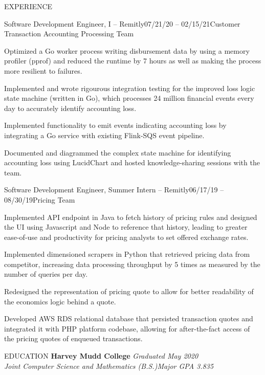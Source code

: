 \documentclass{resume} %
\begin{document}
\begin{rSection}{EXPERIENCE}
    \begin{rSubsection}{Software Development Engineer, I -- Remitly}{07/21/20 -- 02/15/21}{Customer Transaction Accounting Processing Team}{}
        \item Optimized a Go worker process writing disbursement data by using a memory profiler (pprof) and reduced the runtime by 7 hours as well as making the process more resilient to failures.
        \item Implemented and wrote rigourous integration testing for the improved loss logic state machine (written in Go), which processes 24 million financial events every day to accurately identify accounting loss.
        \item Implemented functionality to emit events indicating accounting loss by integrating a Go service with existing Flink-SQS event pipeline.
        \item Documented and diagrammed the complex state machine for identifying accounting loss using LucidChart and hosted knowledge-sharing sessions with the team.
    \end{rSubsection}
    
    \begin{rSubsection}{Software Development Engineer, Summer Intern -- Remitly}{06/17/19 -- 08/30/19}{Pricing Team}{}
        \item Implemented API endpoint in Java to fetch history of pricing rules and designed the UI using Javascript and Node to reference that history, leading to greater ease-of-use and productivity for pricing analysts to set offered exchange rates.
        \item Implemented dimensioned scrapers in Python that retrieved pricing data from competitor, increasing data processing throughput by 5 times as measured by the number of queries per day.
        \item Redesigned the representation of pricing quote to allow for better readability of the economics logic behind a quote.
        \item Developed AWS RDS relational database that persisted transaction quotes and integrated it with PHP platform codebase, allowing for after-the-fact access of the pricing quotes of enqueued transactions.
    \end{rSubsection}
\end{rSection}
\pagebreak
\begin{rSection}{EDUCATION}
{\bf Harvey Mudd College} \hfill {\em Graduated May 2020} \\
{\em Joint Computer Science and Mathematics (B.S.)}\hfill {\em Major GPA 3.835} \\
\end{rSection}
\end{document}
